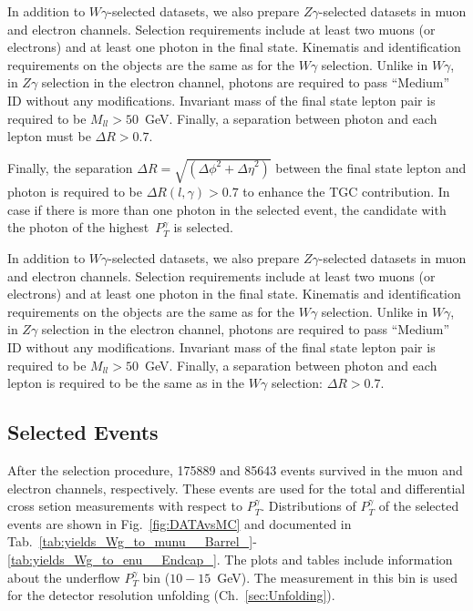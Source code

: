 In addition to $W\gamma$-selected datasets, we also prepare $Z\gamma$-selected datasets in muon and electron channels. Selection requirements include at least two muons (or electrons) and at least one photon in the final state. Kinematis and identification requirements on the objects are the same as for the $W\gamma$ selection. Unlike in $W\gamma$, in $Z\gamma$ selection in the electron channel, photons are required to pass ``Medium'' ID without any modifications. Invariant mass of the final state lepton pair is required to be $M_{ll}>50$~GeV. Finally, a separation between photon and each lepton must be $\Delta R>0.7$.

Finally, the separation $\Delta R=\sqrt{({\Delta\phi}^2+{\Delta\eta}^2)}$ between the final state lepton and photon is required to be $\Delta R(l,\gamma)>0.7$ to enhance the TGC contribution. In case if there is more than one photon in the selected event, the candidate with the photon of the highest~$P_T^{\gamma}$ is selected. 

In addition to $W\gamma$-selected datasets, we also prepare $Z\gamma$-selected datasets in muon and electron channels. Selection requirements include at least two muons (or electrons) and at least one photon in the final state. Kinematis and identification requirements on the objects are the same as for the $W\gamma$ selection. Unlike in $W\gamma$, in $Z\gamma$ selection in the electron channel, photons are required to pass ``Medium'' ID without any modifications. Invariant mass of the final state lepton pair is required to be $M_{ll}>50$~GeV. Finally, a separation between photon and each lepton is required to be the same as in the $W\gamma$ selection: $\Delta R>0.7$. 

\subsection{Selected Events}

After the selection procedure, 175889 and 85643 events survived in the muon and electron channels, respectively. These events are used for the total and differential cross setion measurements with respect to $P_T^{\gamma}$. Distributions of $P_T^{\gamma}$ of the selected events are shown in Fig.~\ref{fig:DATAvsMC} and documented in Tab.~\ref{tab:yields_Wg_to_munu__Barrel_}-\ref{tab:yields_Wg_to_enu__Endcap_}. The plots and tables include information about the underflow $P_T^{\gamma}$ bin ($10-15$~GeV). The measurement in this bin is used for the detector resolution unfolding (Ch.~\ref{sec:Unfolding}). 

